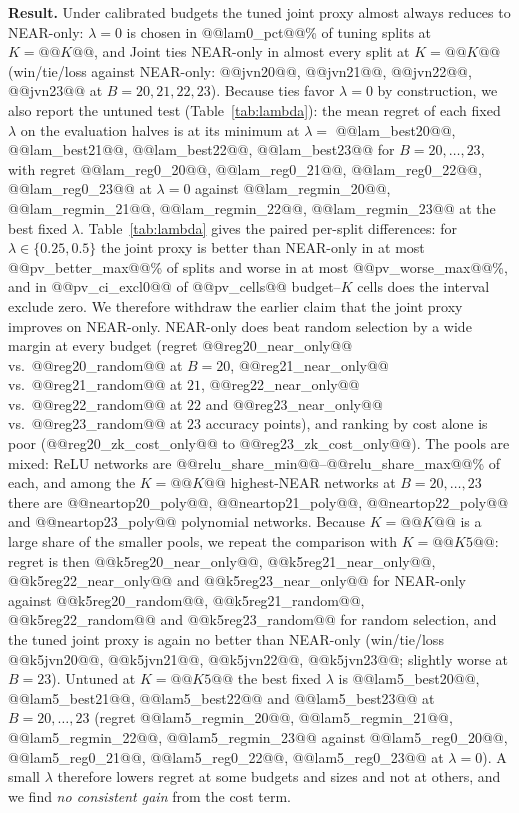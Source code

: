 \textbf{Result.}  Under calibrated budgets the tuned joint proxy almost always reduces to NEAR-only: $\lambda=0$ is chosen in @@lam0_pct@@\% of tuning splits at $K=@@K@@$, and Joint ties NEAR-only in almost
every split at $K=@@K@@$ (win/tie/loss against NEAR-only: @@jvn20@@, @@jvn21@@, @@jvn22@@, @@jvn23@@ at $B=20,21,22,23$).  Because ties favor $\lambda=0$ by construction, we also report the untuned test (Table~\ref{tab:lambda}): the mean regret of each fixed $\lambda$ on the evaluation halves is at its minimum at $\lambda=$ @@lam_best20@@, @@lam_best21@@, @@lam_best22@@, @@lam_best23@@ for $B=20,\dots,23$, with regret @@lam_reg0_20@@, @@lam_reg0_21@@, @@lam_reg0_22@@, @@lam_reg0_23@@ at $\lambda=0$ against @@lam_regmin_20@@, @@lam_regmin_21@@, @@lam_regmin_22@@, @@lam_regmin_23@@ at the best fixed $\lambda$.  Table~\ref{tab:lambda} gives the paired per-split differences: for $\lambda\in\{0.25,0.5\}$ the joint proxy is better than NEAR-only in at most @@pv_better_max@@\% of splits and worse in at most @@pv_worse_max@@\%, and in @@pv_ci_excl0@@ of @@pv_cells@@ budget--$K$ cells does the interval exclude zero.  We therefore withdraw the earlier claim that the joint proxy improves on NEAR-only.
NEAR-only does beat random selection by a wide margin at every budget (regret @@reg20_near_only@@ vs.\ @@reg20_random@@ at $B=20$, @@reg21_near_only@@ vs.\ @@reg21_random@@ at $21$, @@reg22_near_only@@ vs.\ @@reg22_random@@ at $22$ and
@@reg23_near_only@@ vs.\ @@reg23_random@@ at $23$ accuracy points), and ranking by cost alone is poor (@@reg20_zk_cost_only@@ to @@reg23_zk_cost_only@@).  The pools are mixed: ReLU networks are @@relu_share_min@@--@@relu_share_max@@\% of each, and among the $K=@@K@@$ highest-NEAR networks at $B=20,\dots,23$ there are @@neartop20_poly@@, @@neartop21_poly@@, @@neartop22_poly@@ and @@neartop23_poly@@ polynomial
networks.  Because $K=@@K@@$ is a large share of the smaller pools, we repeat the comparison with $K=@@K5@@$: regret is then @@k5reg20_near_only@@, @@k5reg21_near_only@@, @@k5reg22_near_only@@ and @@k5reg23_near_only@@ for NEAR-only against @@k5reg20_random@@, @@k5reg21_random@@, @@k5reg22_random@@ and @@k5reg23_random@@ for random selection,
and the tuned joint proxy is again no better than NEAR-only (win/tie/loss @@k5jvn20@@, @@k5jvn21@@, @@k5jvn22@@, @@k5jvn23@@; slightly worse at $B=23$).  Untuned at $K=@@K5@@$ the best fixed $\lambda$ is @@lam5_best20@@, @@lam5_best21@@, @@lam5_best22@@ and @@lam5_best23@@ at $B=20,\dots,23$ (regret @@lam5_regmin_20@@, @@lam5_regmin_21@@, @@lam5_regmin_22@@, @@lam5_regmin_23@@ against @@lam5_reg0_20@@, @@lam5_reg0_21@@, @@lam5_reg0_22@@, @@lam5_reg0_23@@ at $\lambda=0$).  A small $\lambda$ therefore lowers regret at some budgets and sizes and not at others, and we find \emph{no consistent gain} from the cost term.

